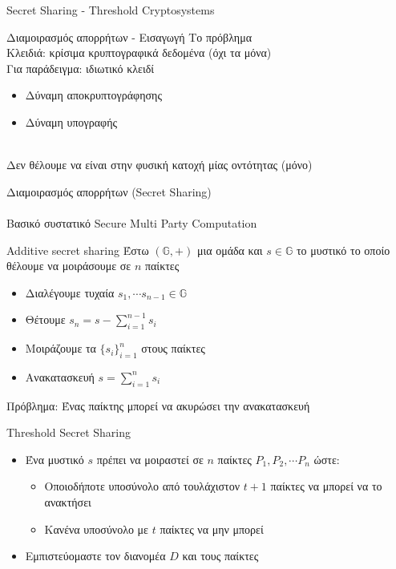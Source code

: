 \documentclass[handout]{beamer}
\begin{document}
\begin{section}{Secret Sharing - Threshold Cryptosystems}
\begin{frame}{Διαμοιρασμός απορρήτων - Εισαγωγή}
\alert{Το πρόβλημα}\\
Κλειδιά: κρίσιμα κρυπτογραφικά δεδομένα (όχι τα μόνα)\\
\medskip
\pause
Για παράδειγμα: ιδιωτικό κλειδί
\begin{itemize}
\item Δύναμη αποκρυπτογράφησης
\item Δύναμη υπογραφής
\end{itemize}
\medskip
\pause
{}\\
Δεν θέλουμε να είναι στην φυσική κατοχή μίας οντότητας (μόνο)

Διαμοιρασμός απορρήτων (Secret Sharing) \\
\pause
{}\\

Βασικό συστατικό Secure Multi Party Computation
\end{frame}

\begin{frame}{Additive secret sharing}
Έστω $(\mathbb{G},+)$ μια ομάδα και $s \in \mathbb{G}$ το μυστικό το οποίο θέλουμε να μοιράσουμε σε $n$ παίκτες

\begin{itemize}

\pause
\item Διαλέγουμε τυχαία $s_1, \cdots s_{n-1} \in \mathbb{G}$

\pause
\item Θέτουμε $s_n = s - \sum_{i=1}^{n-1} s_i$

\pause
\item Μοιράζουμε τα $\{ s_i \}_{i=1}^n$ στους παίκτες

\pause
\item Ανακατασκευή $s = \sum_{i=1}^n s_i$

\end{itemize}

\pause
\alert{Πρόβλημα:} Ένας παίκτης μπορεί να ακυρώσει την ανακατασκευή 
\end{frame}

\begin{frame}{Threshold Secret Sharing}
\begin{itemize}
\item Ένα μυστικό $s$ πρέπει να μοιραστεί σε $n$ παίκτες $P_1, P_2, \cdots P_n$ ώστε:
\pause
\begin{itemize}
\item Οποιοδήποτε υποσύνολο από τουλάχιστον $t+1$ παίκτες να μπορεί να το ανακτήσει
\pause
\item Κανένα υποσύνολο με $t$ παίκτες να μην μπορεί
\pause
\end{itemize}
\item {} Εμπιστεύομαστε τον διανομέα $D$ και τους παίκτες
\end{itemize}
\end{frame}


\end{section}
\end{document}
